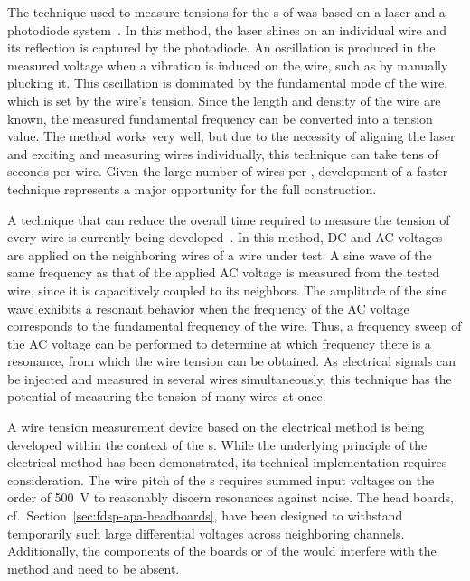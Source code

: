 The technique  
used to measure tensions for the s of  was based on a laser and a photodiode system~\cite{Acciarri:2016ugk}. In this method, the laser shines on an individual wire and its reflection is captured by the photodiode. An oscillation is produced in the measured voltage when a vibration is induced on the wire, such as by manually plucking it. This oscillation is dominated by the fundamental mode of the wire, which is set by the wire's tension. Since the length and density of the wire are known, the measured fundamental frequency can be converted into a tension value. The method works very well, but due to the necessity of aligning the laser and exciting and measuring wires individually, this technique can take tens of seconds per wire. Given the large number of wires per , development of a faster technique represents a major opportunity for the full  construction.

A technique that can reduce the overall time required to measure the tension of every wire is currently being developed~\cite{Garcia-Gamez:2018frz}. In this method, DC and AC voltages are applied on the neighboring wires of a wire under test. A sine wave of the same frequency as that of the applied AC voltage is measured from the tested wire, since it is capacitively coupled to its neighbors. The amplitude of the sine wave exhibits a resonant behavior when the frequency of the AC voltage corresponds to the fundamental frequency of the wire. Thus, a frequency sweep of the AC voltage can be performed to determine at which frequency there is a resonance, from which the wire tension can be obtained. As electrical signals can be injected and measured in several wires simultaneously, this technique has the potential of measuring the tension of many wires at once.

A wire tension measurement device based on the electrical method is being developed within the context of the  s. While the underlying principle of the electrical method has been demonstrated, its technical implementation requires consideration. The wire pitch of the s requires summed input voltages on the order of \SI{500}{V} to reasonably discern resonances against noise. The head boards, cf.\ Section~\ref{sec:fdsp-apa-headboards}, have been designed to withstand temporarily such large differential voltages across neighboring channels. Additionally, the components of the  boards or of the  would interfere with the method and need to be absent.

